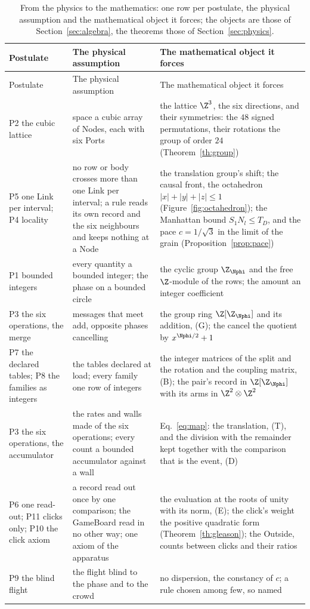 {\scriptsize\setlength{\tabcolsep}{3pt}
\begin{longtable}{L{1.35in}L{2.2in}L{2.55in}}
\caption{\label{tab:forward}From the physics to the mathematics: one row per postulate, the physical assumption and the mathematical object it forces; the objects are those of Section~\ref{sec:algebra}, the theorems those of Section~\ref{sec:physics}.}\\
\toprule
Postulate & The physical assumption & The mathematical object it forces \\
\midrule
\endfirsthead
\toprule
Postulate & The physical assumption & The mathematical object it forces \\
\midrule
\endhead
\bottomrule
\endlastfoot
P2 the cubic lattice & space a cubic array of Nodes, each with six Ports & the lattice $\Z^3$, the six directions, and their symmetries: the $48$ signed permutations, their rotations the group of order $24$ (Theorem~\ref{th:group}) \\
P5 one Link per interval; P4 locality & no row or body crosses more than one Link per interval; a rule reads its own record and the six neighbours and keeps nothing at a Node & the translation group's shift; the causal front, the octahedron $|x| + |y| + |z| \le 1$ (Figure~\ref{fig:octahedron}); the Manhattan bound $S_1N_l \le T_D$, and the pace $c = 1/\sqrt3$ in the limit of the grain (Proposition~\ref{prop:pace}) \\
P1 bounded integers & every quantity a bounded integer; the phase on a bounded circle & the cyclic group $\Z_{\Nphi}$ and the free $\Z$-module of the rows; the amount an integer coefficient \\
P3 the six operations, the merge & messages that meet add, opposite phases cancelling & the group ring $\Z[\Z_{\Nphi}]$ and its addition, (G); the cancel the quotient by $x^{\Nphi/2} + 1$ \\
P7 the declared tables; P8 the families as integers & the tables declared at load; every family one row of integers & the integer matrices of the split and the rotation and the coupling matrix, (B); the pair's record in $\Z[\Z_{\Nphi}]$ with its arms in $\Z^2 \otimes \Z^2$ \\
P3 the six operations, the accumulator & the rates and walls made of the six operations; every count a bounded accumulator against a wall & Eq.~\eqref{eq:map}: the translation, (T), and the division with the remainder kept together with the comparison that is the event, (D) \\
P6 one read-out; P11 clicks only; P10 the click axiom & a record read out once by one comparison; the GameBoard read in no other way; one axiom of the apparatus & the evaluation at the roots of unity with its norm, (E); the click's weight the positive quadratic form (Theorem~\ref{th:gleason}); the Outside, counts between clicks and their ratios \\
P9 the blind flight & the flight blind to the phase and to the crowd & no dispersion, the constancy of $c$; a rule chosen among few, so named \\
\end{longtable}}

